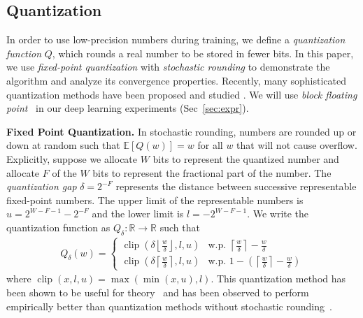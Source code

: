 \documentclass{article}
\begin{document}
\subsection{Quantization}\label{sec:method-quant}

In order to use low-precision numbers during training, we define a \emph{quantization function} $Q$, which rounds a real number to be stored in fewer bits.
In this paper, we use \emph{fixed-point quantization} with \emph{stochastic rounding} to demonstrate the algorithm and analyze its convergence properties.
Recently, many sophisticated quantization methods have been proposed and studied \cite{log-quant,flexpoint,dyanmic-fixed-point,low-precision-multiply}.
We will use \emph{block floating point}~\cite{error-analysis} in our deep learning experiments (Sec~\ref{sec:expr}).

\textbf{Fixed Point Quantization.}
In stochastic rounding, numbers are rounded up or down at random such that $\mathbb{E}[Q(w)] = w$ for all $w$ that will not cause overflow.
Explicitly, suppose we allocate $W$ bits to represent the quantized number and allocate $F$ of the $W$ bits to represent the fractional part of the number.
The \emph{quantization gap} $\delta=2^{-F}$ represents the distance between successive representable fixed-point numbers.
The upper limit of the representable numbers is $u=2^{W-F-1}-2^{-F}$ and the lower limit is $l=-2^{W-F-1}$.
We write the quantization function as $Q_\delta: \mathbb{R} \rightarrow \mathbb{R}$ such that
\begin{align}
    Q_\delta(w) = \textstyle\begin{cases}
    \operatorname{clip}(\delta \left \lfloor \frac{w}{\delta} \right \rfloor, l,u) & \text{w.p. } \left \lceil \frac{w}{\delta} \right \rceil - \frac{w}{\delta} \\ 
    \operatorname{clip}(\delta \left \lceil \frac{w}{\delta} \right \rceil, l,u) & \text{w.p. } 1-(\left \lceil \frac{w}{\delta} \right \rceil - \frac{w}{\delta})
    \end{cases}\label{eq:fixed-point-SR}
\end{align}
where $\operatorname{clip}(x,l,u) = \max(\min(x,u), l)$.
This quantization method has been shown to be useful for theory~\cite{training-quantized-network-deeper-understanding} and has been observed to perform empirically better than quantization methods without stochastic rounding~\cite{gupta2015deep}.
\end{document}
